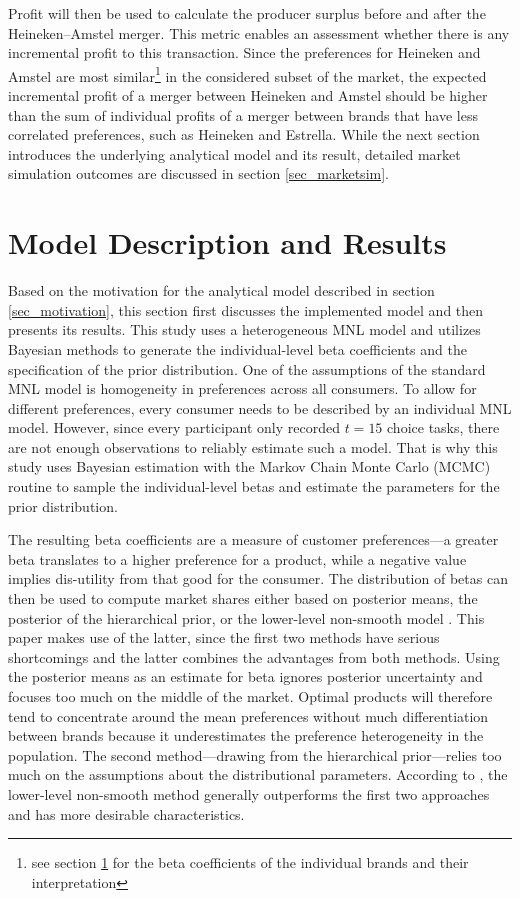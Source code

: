 \documentclass[12pt,a4paper]{article}
\begin{document}
Profit will then be used to calculate the producer surplus before and after the Heineken--Amstel merger.
This metric enables an assessment whether there is any incremental profit to this transaction.
Since the preferences for Heineken and Amstel are most similar\footnote{see section \ref{sec_model} for the beta coefficients of the individual brands and their interpretation} in the considered subset of the market, the expected incremental profit of a merger between Heineken and Amstel should be higher than the sum of individual profits of a merger between brands that have less correlated preferences, such as Heineken and Estrella.
While the next section introduces the underlying analytical model and its result, detailed market simulation outcomes are discussed in section \ref{sec_marketsim}.


\section{Model Description and Results} \label{sec_model}

Based on the motivation for the analytical model described in section \ref{sec_motivation}, this section first discusses the implemented model and then presents its results.
This study uses a heterogeneous MNL model and utilizes Bayesian methods to generate the individual-level beta coefficients and the specification of the prior distribution.
One of the assumptions of the standard MNL model is homogeneity in preferences across all consumers.
To allow for different preferences, every consumer needs to be described by an individual MNL model.
However, since every participant only recorded $t=15$ choice tasks, there are not enough observations to reliably estimate such a model.
That is why this study uses Bayesian estimation with the Markov Chain Monte Carlo (MCMC) routine to sample the individual-level betas and estimate the parameters for the prior distribution.

The resulting beta coefficients are a measure of customer preferences---a greater beta translates to a higher preference for a product, while a negative value implies dis-utility from that good for the consumer.
The distribution of betas can then be used to compute market shares either based on posterior means, the posterior of the hierarchical prior, or the lower-level non-smooth model \citep{pachaliHowGeneralizeHierarchical2017}.
This paper makes use of the latter, since the first two methods have serious shortcomings and the latter combines the advantages from both methods.
Using the posterior means as an estimate for beta ignores posterior uncertainty and focuses too much on the middle of the market.
Optimal products will therefore tend to concentrate around the mean preferences without much differentiation between brands because it underestimates the preference heterogeneity in the population.
The second method---drawing from the hierarchical prior---relies too much on the assumptions about the distributional parameters. 
According to \cite{pachaliHowGeneralizeHierarchical2017}, the lower-level non-smooth method generally outperforms the first two approaches and has more desirable characteristics.
\end{document}
